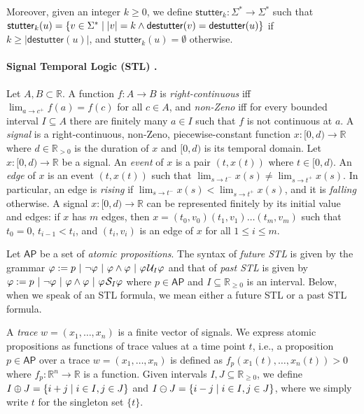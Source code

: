 \documentclass[iicol,lineno]{sn-jnl}
\newcommand{\AP}{\mathsf{AP}}
\newcommand{\destutter}{\mathsf{destutter}}
\newcommand{\stutter}{\mathsf{stutter}}
\newcommand{\R}{\mathbb{R}}
\def\until{\kern.1em\mathcal{U}}
\def\since{\kern.1em\mathcal{S}}
\newcommand{\?}{\text{?}}
\newcommand{\suchthat}{\;\ifnum\currentgrouptype=16 \middle\fi|\;}
\let\st\suchthat
\begin{document}
	Moreover, given an integer $k \geq 0$, we define $\stutter_k : \Sigma^* \to \Sigma^*$ such that $\stutter_k(u) = \{v \in \Sigma^* \st |v| = k \land \destutter(v) = \destutter(u)\}$ if $k \geq |\destutter(u)|$, and $\stutter_k(u) = \emptyset$ otherwise.
	
	\paragraph*{Signal Temporal Logic (STL) \cite{MalerN13}.}
	Let $A,B \subset \R$.
	A function $f : A \to B$ is
	\emph{right-continuous} iff $\lim_{a \to c^+} f(a) = f(c)$ for all $c \in A$, and
	\emph{non-Zeno} iff for every bounded interval $I \subseteq A$ there are finitely many $a \in I$ such that $f$ is not continuous at $a$.
	A \emph{signal} is a right-continuous, non-Zeno, piecewise-constant function $x : [0,d) \to \R$ where $d \in \R_{> 0}$ is the duration of $x$ and $[0,d)$ is its temporal domain.
	Let $x : [0,d) \to \R$ be a signal.
	An \emph{event} of $x$ is a pair $(t, x(t))$ where $t \in [0,d)$.
	An \emph{edge} of $x$ is an event $(t, x(t))$ such that $\lim_{s \to t^-} x(s) \neq \lim_{s \to t^+} x(s)$.
	In particular, an edge is \emph{rising} if $\lim_{s \to t^-} x(s) < \lim_{s \to t^+} x(s)$, and it is \emph{falling} otherwise.
	A signal $x : [0,d) \to \R$ can be represented finitely by its initial value and edges: if $x$ has $m$ edges, then $x = (t_0, v_0) (t_1, v_1) \ldots (t_m, v_m)$ such that $t_0 = 0$, $t_{i-1} < t_i$, and $(t_i, v_i)$ is an edge of $x$ for all $1 \leq i \leq m$.
	
	Let $\AP$ be a set of \emph{atomic propositions}.
	The syntax of \emph{future STL} is given by the grammar $\varphi :=  p ~|~ \lnot \varphi ~|~ \varphi \land \varphi ~|~ \varphi \until_I \varphi$ and that of \emph{past STL} is given by $\varphi :=  p ~|~ \lnot \varphi ~|~ \varphi \land \varphi ~|~ \varphi \since_I \varphi$ where $p \in \AP$ and $I \subseteq \R_{\geq 0}$ is an interval.
	Below, when we speak of an STL formula, we mean either a future STL or a past STL formula.
	
	A \emph{trace} $w = (x_1, \ldots, x_n)$ is a finite vector of signals.
	We express atomic propositions as functions of trace values at a time point $t$,
	i.e., a proposition $p \in \AP$ over a trace $w = (x_1, \ldots, x_n)$ is defined as $f_p(x_1(t), \ldots, x_n(t)) > 0$ where $f_p : \R^n \to \R$ is a function.
	Given intervals $I,J \subseteq \R_{\geq 0}$, we define $I \oplus J = \{i + j \st i \in I , j \in J\}$ and $I \ominus J = \{i - j \st i \in I , j \in J\}$, where we simply write $t$ for the singleton set $\{t\}$. 
	
\end{document}
